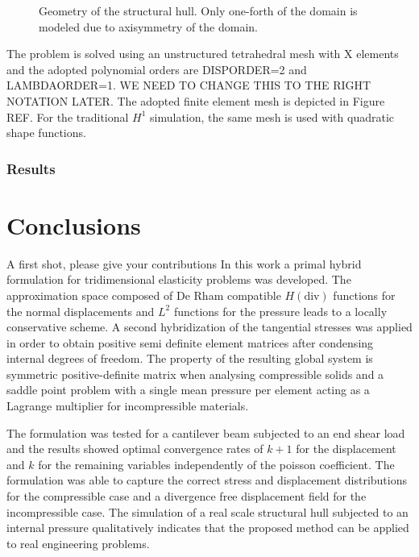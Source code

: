 \documentclass[english,11pt,3p,number,sort&compress]{elsarticle}
\newcommand{\giovane}{\color{red}{\bf\Large GA} \color{cyan} }
\newcommand{\nathan}{\color{red}{\bf\Large NS} \color{cyan} }
\begin{document}
\begin{figure}[h]
    \centering
    \def\svgwidth{450pt} 
    
    \caption{Geometry of the structural hull. Only one-forth of the domain is modeled due to axisymmetry of the domain.}
    \label{fig:module-geometry}
\end{figure}

The problem is solved using an unstructured tetrahedral mesh with X elements and the adopted polynomial orders are {\nathan DISPORDER=2 and LAMBDAORDER=1. WE NEED TO CHANGE THIS TO THE RIGHT NOTATION LATER}. The adopted finite element mesh is depicted in Figure REF. For the traditional $H^1$ simulation, the same mesh is used with quadratic shape functions.

\subsubsection{Results}


\section{Conclusions}

{\giovane A first shot, please give your contributions}
In this work a primal hybrid formulation for tridimensional elasticity problems was developed. The approximation space composed of De Rham compatible $H(\text{div})$ functions for the normal displacements and  $L^2$ functions for the pressure leads to a locally conservative scheme. A second hybridization of the tangential stresses was applied in order to obtain positive semi definite element matrices after condensing internal degrees of freedom. The property of the resulting global system is  symmetric positive-definite matrix when analysing compressible solids and a saddle point problem with a single mean pressure per element acting as a Lagrange multiplier for incompressible materials.

The formulation was tested for a cantilever beam subjected to an end shear load and the results showed optimal convergence rates of $k+1$ for the displacement and $k$ for the remaining variables independently of the poisson coefficient. The formulation was able to capture the correct stress and displacement distributions for the compressible case and a divergence free displacement field for the incompressible case. The simulation of a real scale structural hull subjected to an internal pressure qualitatively indicates that the proposed method can be applied to real engineering problems.
\end{document}
